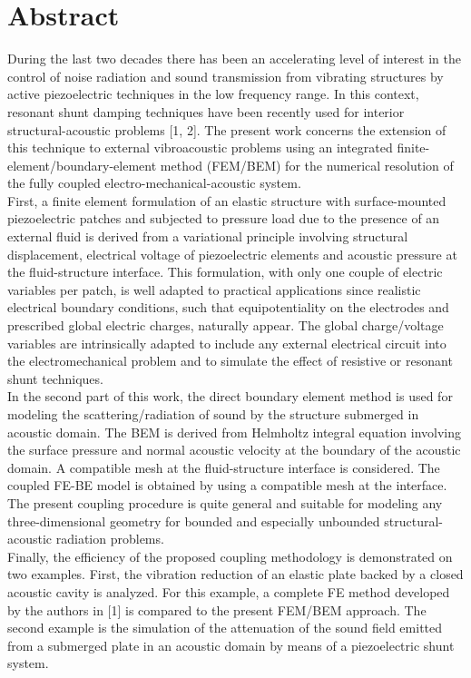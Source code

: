 \documentclass[article,A4,11pt]{llncs}%
\begin{document}
\section*{Abstract}
During the last two decades there has been an accelerating level of interest in the control of noise radiation and sound transmission from vibrating structures by active piezoelectric techniques in the low frequency range. In this context, resonant shunt damping techniques have been recently used for interior structural-acoustic problems [1, 2]. The present work concerns the extension of this technique to external vibroacoustic problems using an integrated finite-element/boundary-element method (FEM/BEM) for the numerical resolution of the fully coupled electro-mechanical-acoustic system.\\  

First, a finite element formulation of an elastic structure with surface-mounted piezoelectric patches and subjected to pressure load due to the presence of an external fluid is derived from a variational principle involving structural displacement, electrical voltage of piezoelectric elements and acoustic pressure at the fluid-structure interface. This formulation, with only one couple of electric variables per patch, is well adapted to practical applications since realistic electrical boundary conditions, such that equipotentiality on the electrodes and prescribed global electric charges, naturally appear. The global charge/voltage variables are intrinsically adapted to include any external electrical circuit into the electromechanical problem and to simulate the effect of resistive or resonant shunt techniques.\\

In the second part of this work, the direct boundary element method is used for modeling the scattering/radiation of sound by the structure submerged in acoustic domain. The BEM is derived from Helmholtz integral equation involving the surface pressure and normal acoustic velocity at the boundary of the acoustic domain. A compatible mesh at the fluid-structure interface is considered. The coupled FE-BE model is obtained by using a compatible mesh at the interface. The present coupling procedure is quite general and suitable for modeling any three-dimensional geometry for bounded and especially unbounded structural-acoustic radiation problems.\\

Finally, the efficiency of the proposed coupling methodology is demonstrated on two examples. First, the vibration reduction of an elastic plate backed by a closed acoustic cavity is analyzed. For this example, a complete FE method developed by the authors in [1] is compared to the present FEM/BEM approach.  The second example is the simulation of the attenuation of the sound field emitted from a submerged plate in an acoustic domain by means of a piezoelectric shunt system. 
\end{document}

